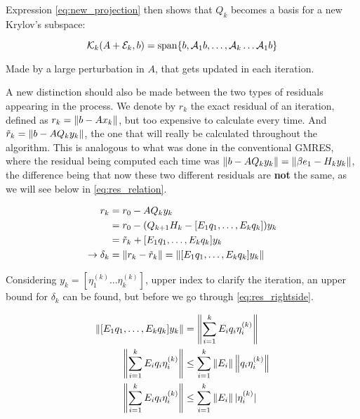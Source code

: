 Expression \ref{eq:new_projection} then shows that $Q_{k}$ becomes a basis for a new Krylov's subspace:

\begin{equation}
    \mathcal{K}_{k}(A+\mathcal{E}_{k},b)= \operatorname{span} \{b,\mathcal{A}_{1}b,\dots, \mathcal{A}_{k}\dots\mathcal{A}_{1}b \}    
\end{equation}
 

Made by a large perturbation in $A$, that gets updated in each iteration.

A new distinction should also be made between the two types of residuals appearing in the process. We denote by $r_{k}$ the exact residual of an iteration, defined as $r_{k} = \left\lVert b - Ax_{k}\right\rVert$, but too expensive to calculate every time. And $\tilde{r}_{k}=\left\lVert b-AQ_{k}y_{k}\right\rVert$, the one that will really be calculated throughout the algorithm. This is analogous to what was done in the conventional GMRES, where the residual being computed each time was $\left\lVert b-AQ_{k}y_{k}\right\rVert = \left\lVert\beta e_{1} - H_{k}y_{k}\right\rVert$, the difference being that now these two different residuals are \textbf{not} the same, as we will see below in \ref{eq:res_relation}.


\begin{align}\label{eq:res_relation}
    \begin{split}
        r_{k} &= r_{0} - AQ_{k}y_{k}\\
        &= r_{0} - (Q_{k+1}H_{k} - [E_{1}q_{1},\dots , E_{k}q_{k}])y_{k}\\
        &= \tilde{r}_{k} +[E_{1}q_{1},\dots , E_{k}q_{k}]y_{k}\\
        \rightarrow \delta_{k} &= \left\lVert r_{k} - \tilde{r}_{k}\right\rVert  = \left\lVert[E_{1}q_{1},\dots , E_{k}q_{k}]y_{k}\right\rVert
    \end{split}
\end{align}

Considering $y_{k} = [\eta_{1}^{(k)} \dots \eta_{k}^{(k)} ] $, upper index to clarify the iteration, an upper bound for $\delta_{k}$ can be found, but before we go through \ref{eq:res_rightside}.

\begin{align}\label{eq:res_rightside}
    \begin{split}
        \left\lVert[E_{1}q_{1},\dots , E_{k}q_{k}]y_{k}\right\rVert & = \left\lVert\sum_{i=1}^{k}E_{i}q_{i}\eta^{(k)}_{i}\right\rVert\\
        \left\lVert\sum_{i=1}^{k}E_{i}q_{i}\eta^{(k)}_{i}\right\rVert & \leq \sum_{i=1}^{k}\left\lVert E_{i}\right\rVert\left\lVert q_{i}\eta^{(k)}_{i}\right\rVert\\
        \left\lVert\sum_{i=1}^{k}E_{i}q_{i}\eta^{(k)}_{i}\right\rVert & \leq \sum_{i=1}^{k}\left\lVert E_{i}\right\rVert|\eta^{(k)}_{i}|
    \end{split}
\end{align}

